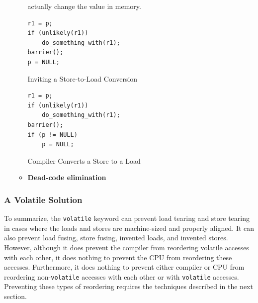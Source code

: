 \documentclass[11pt]{article}
\begin{document}
\begin{itemize}
\begin{itemize}
actually change the value in memory.
\begin{listing}[htbp]
\begin{verbatim}
r1 = p;
if (unlikely(r1))
    do_something_with(r1);
barrier();
p = NULL;
\end{verbatim}
\caption{\label{l4.22}Inviting a Store-to-Load Conversion}
\end{listing}
\begin{listing}[htbp]
\begin{verbatim}
r1 = p;
if (unlikely(r1))
    do_something_with(r1);
barrier();
if (p != NULL)
    p = NULL;
\end{verbatim}
\caption{\label{l4.23}Compiler Converts a Store to a Load}
\end{listing}
\item \textbf{Dead-code elimination}
\end{itemize}
\end{itemize}
\subsubsection{A Volatile Solution}
\label{sec:orga5bce17}
To summarize, the \texttt{volatile} keyword can prevent load tearing and store tearing in cases where the loads
and stores are machine-sized and properly aligned. It can also prevent load fusing, store fusing,
invented loads, and invented stores. However, although it does prevent the compiler from reordering
volatile accesses with each other, it does nothing to prevent the CPU from reordering these accesses.
Furthermore, it does nothing to prevent either compiler or CPU from reordering non-\texttt{volatile} accesses
with each other or with \texttt{volatile} accesses. Preventing these types of reordering requires the techniques described in the next section.
\end{document}
